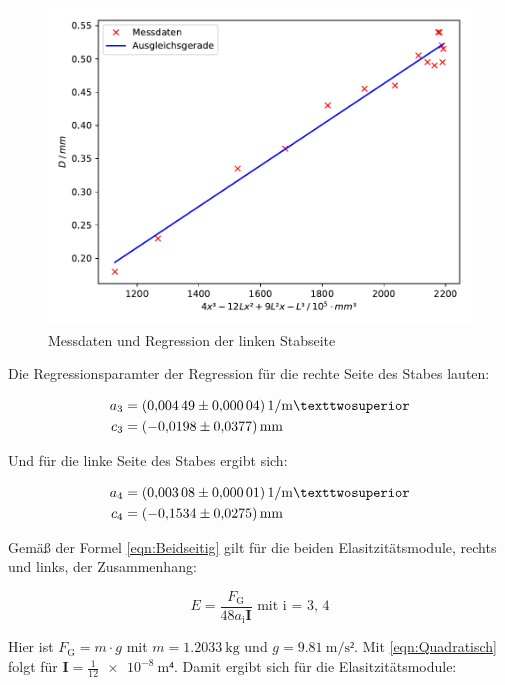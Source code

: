 \begin{figure}
  \centering
  \includegraphics[scale=0.8]{content/plot4.pdf}
  \caption{Messdaten und Regression der linken Stabseite}
  \label{fig:plot4}
\end{figure}

Die Regressionsparamter der Regression für die rechte Seite des Stabes
lauten:

\begin{align*}
a_3 &= \SI{0.00449+-0.00004}{1\per\meter²}\\
c_3 &= \SI{-0.0198+-0.0377}{\milli\meter}
\end{align*}

Und für die linke Seite des Stabes ergibt sich: 

\begin{align*}
a_4 &= \SI{0.00308+-0.00001}{1\per\meter²}\\
c_4 &= \SI{-0.1534+-0.0275}{\milli\meter}
\end{align*}

Gemäß der Formel \eqref{eqn:Beidseitig} gilt für die beiden Elasitzitätsmodule, rechts und links, 
der Zusammenhang: 

\begin{equation*}
E = \frac{F_\text{G}}{48a_\text{i}\symbf{I}} \text{ mit i = 3, 4}
\end{equation*}

Hier ist $F_\text{G} = m\cdot g$ mit $m = \SI{1.2033}{\kilo\gram}$ und 
$g = \SI{9.81}{\meter\per\second²}$.
Mit \eqref{eqn:Quadratisch} folgt für $\symbf{I} = \frac{1}{12}\SI{e-8}{\meter⁴}$. Damit 
ergibt sich für die Elasitzitätsmodule: 

